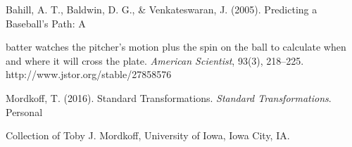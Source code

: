 \documentclass[12pt]{article}
\begin{document}
\smallskip


\bigskip


\smallskip


\newpage



\bigskip

\begin{minipage}{\textwidth}
Bahill, A. T., Baldwin, D. G., \& Venkateswaran, J. (2005). Predicting a Baseball’s Path: A
\end{minipage}


\vspace{0.15 cm}

\hspace*{1cm}
\begin{minipage}{.9\textwidth}
    batter watches the pitcher’s motion plus the spin on the ball to calculate when and where it will cross the plate. \textit{American Scientist}, 93(3), 218–225. http://www.jstor.org/stable/27858576
\end{minipage}

\vspace{0.8 cm}

\begin{minipage}{\textwidth}
Mordkoff, T. (2016). Standard Transformations. \textit{Standard Transformations}. Personal 
\end{minipage}


\vspace{0.15 cm}

\hspace*{1cm}
\begin{minipage}{.9\textwidth}
   Collection of Toby J. Mordkoff, University of Iowa, Iowa City, IA.
\end{minipage}
\end{document}
